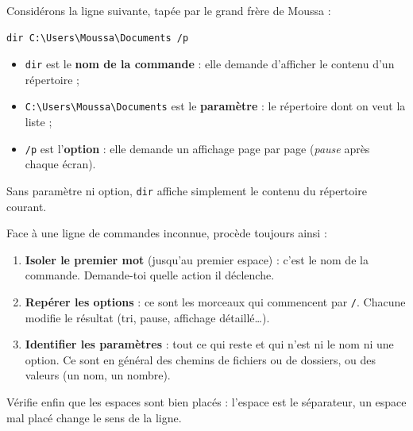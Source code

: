 \documentclass[11pt]{article}
\begin{document}
\begin{exemplebox}
Considérons la ligne suivante, tapée par le grand frère de Moussa :
\begin{lstlisting}
dir C:\Users\Moussa\Documents /p
\end{lstlisting}
\begin{itemize}
\item \texttt{dir} est le \textbf{nom de la commande} : elle demande d'afficher le contenu d'un répertoire ;
\item \texttt{C:\textbackslash Users\textbackslash Moussa\textbackslash Documents} est le \textbf{paramètre} : le répertoire dont on veut la liste ;
\item \texttt{/p} est l'\textbf{option} : elle demande un affichage page par page (\emph{pause} après chaque écran).
\end{itemize}
Sans paramètre ni option, \texttt{dir} affiche simplement le contenu du répertoire courant.
\end{exemplebox}

\begin{methode}
Face à une ligne de commandes inconnue, procède toujours ainsi :
\begin{enumerate}
\item \textbf{Isoler le premier mot} (jusqu'au premier espace) : c'est le nom de la commande. Demande-toi quelle action il déclenche.
\item \textbf{Repérer les options} : ce sont les morceaux qui commencent par \texttt{/}. Chacune modifie le résultat (tri, pause, affichage détaillé\ldots).
\item \textbf{Identifier les paramètres} : tout ce qui reste et qui n'est ni le nom ni une option. Ce sont en général des chemins de fichiers ou de dossiers, ou des valeurs (un nom, un nombre).
\end{enumerate}
Vérifie enfin que les espaces sont bien placés : l'espace est le séparateur, un espace mal placé change le sens de la ligne.
\end{methode}
\end{document}

